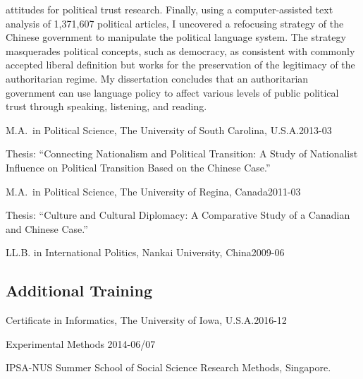 \documentclass[10.5pt,]{article}
\providecommand{\tightlist}{%
	\setlength{\itemsep}{0pt}\setlength{\parskip}{0pt}}
\renewenvironment{itemize}{
	\begin{list}{}{
			\setlength{\leftmargin}{1.5em}
		}
	}{
	\end{list}
}
\begin{document}
\begin{itemize}
\begin{itemize}
\begin{itemize}
      attitudes for political trust research. Finally, using a
      computer-assisted text analysis of 1,371,607 political articles, I
      uncovered a refocusing strategy of the Chinese government to
      manipulate the political language system. The strategy masquerades
      political concepts, such as democracy, as consistent with commonly
      accepted liberal definition but works for the preservation of the
      legitimacy of the authoritarian regime. My dissertation concludes
      that an authoritarian government can use language policy to affect
      various levels of public political trust through speaking,
      listening, and reading.
    \end{itemize}
  \end{itemize}
\item
  M.A.~in Political Science, The University of South Carolina,
  U.S.A.\hfill 2013-03

  \begin{itemize}
  \tightlist
  \item
    \footnotesize Thesis: ``Connecting Nationalism and Political
    Transition: A Study of Nationalist Influence on Political Transition
    Based on the Chinese Case.''
  \end{itemize}
\item
  M.A.~in Political Science, The University of Regina,
  Canada\hfill 2011-03

  \begin{itemize}
  \tightlist
  \item
    \footnotesize Thesis: ``Culture and Cultural Diplomacy: A
    Comparative Study of a Canadian and Chinese Case.''
  \end{itemize}
\item
  LL.B. in International Politics, Nankai University,
  China\hfill 2009-06
\end{itemize}

\subsection{Additional Training}\label{additional-training}

\begin{itemize}
\tightlist
\item
  Certificate in Informatics, The University of Iowa,
  U.S.A.\hfill 2016-12
\item
  Experimental Methods \hfill 2014-06/07

  \begin{itemize}
  \tightlist
  \item
    \footnotesize IPSA-NUS Summer School of Social Science Research
    Methods, Singapore.
  \end{itemize}
\end{itemize}
\end{document}
